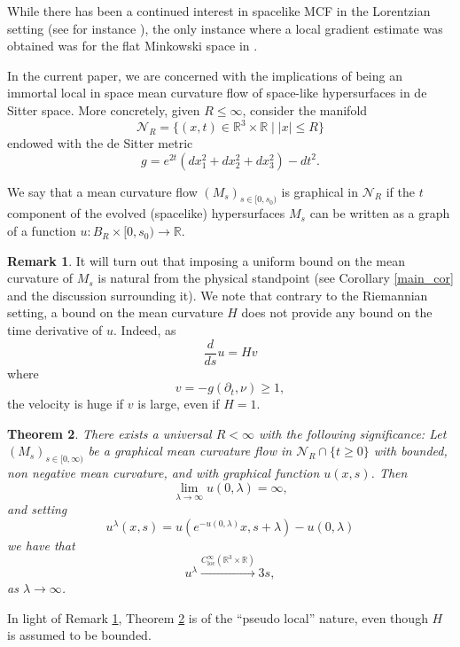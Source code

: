 \documentclass[leqno,11pt]{amsart}
\newtheorem{theorem}{Theorem}[section]
\theoremstyle{definition}
\newtheorem{remark}[theorem]{Remark}
\begin{document}
\bigskip

While there has been a continued interest in spacelike MCF in the Lorentzian setting (see for instance \cite{Ecker_null, Ecker_mink,Ecker_flat,Smock_evol,Lamb_neu,RS}), the only instance where a local gradient estimate was obtained was for the flat Minkowski space in \cite{Ecker_mink}. 

\bigskip

In the current paper, we are concerned with the implications of being an immortal local in space  mean curvature flow of space-like hypersurfaces in de Sitter space. More concretely, given $R\leq \infty$, consider the manifold 
\begin{equation}
\mathcal{N}_R=\{(x,t)\in \mathbb{R}^3\times \mathbb{R}\;|\; |x| \leq R \}
\end{equation}
endowed with the de Sitter metric 
\begin{equation}\label{ds_metric_intro}
g=e^{2t}(dx_1^2+dx_2^2+dx_3^2)-dt^2.
\end{equation}


\bigskip

We say that a mean curvature flow $(M_s)_{s\in [0,s_0)}$ is graphical in $\mathcal{N}_R$ if the $t$ component of the evolved (spacelike) hypersurfaces $M_s$ can be written as a graph of a function $u:B_R\times [0,s_0)\rightarrow \mathbb{R}$. 

\begin{remark}\label{pseudo_local_nature} 
It will turn out that imposing  a uniform bound on the mean curvature of $M_s$ is natural from the physical standpoint (see Corollary \ref{main_cor} and the discussion surrounding it). We note that contrary to the Riemannian setting, a bound on the mean curvature $H$ does not provide any bound on the time derivative of $u$.  Indeed, as 
\begin{equation}
\frac{d}{ds}u= Hv
\end{equation}
where
\[
v=-g(\partial_t,\nu)\geq 1,
\]
the velocity is huge if $v$ is large, even if $H=1$. 
\end{remark}

\begin{theorem}\label{main_thm}
There exists a universal $R<\infty$ with the following significance: Let  $(M_s)_{s\in [0,\infty)}$   be a graphical mean curvature flow in $\mathcal{N}_R\cap \{t\geq 0\}$ with bounded, non negative mean curvature, and  with graphical function $u(x,s)$. Then
\begin{equation}
{\lim_{\lambda \rightarrow \infty}u(0,\lambda)=\infty,}
\end{equation}
and setting
\begin{equation}
u^{\lambda}(x,s)=u(e^{-u(0,\lambda)}x,s+\lambda)-{{u(0,\lambda)}}
\end{equation}
we have that 
\begin{equation}
u^{\lambda}\xrightarrow{C^{\infty}_{\mathrm{loc}}(\mathbb{R}^3\times \mathbb{R})} 3s,
\end{equation}
as $\lambda\rightarrow \infty$.
\end{theorem}
In light of Remark \ref{pseudo_local_nature}, Theorem \ref{main_thm} is of the ``pseudo local'' nature, even though $H$ is assumed to be bounded.  
\end{document}
